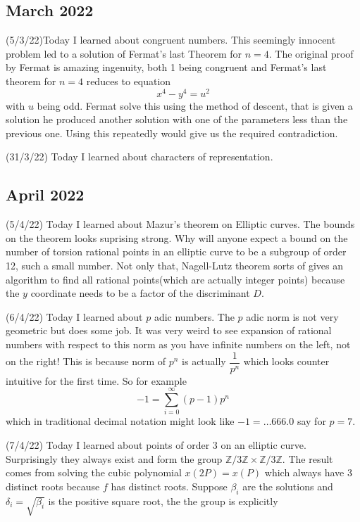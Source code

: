 \documentclass[12pt,a4paper]{article}
\newcommand{\Z}{\mathbb{Z}}
\begin{document}
   	
\subsection*{March 2022}
   	
\quad (5/3/22)Today I learned about congruent numbers. This seemingly innocent problem led to a solution of Fermat's last Theorem for $n=4$. The original proof by Fermat is amazing ingenuity, both 1 being congruent and Fermat's last theorem for $n=4$ reduces to equation
   \[ x^4-y^4 = u^2 \]
with $u$  being odd. Fermat solve this using the method of descent, that is given a solution he produced another solution with one of the parameters less than the previous one. Using this repeatedly would give us the required contradiction.
   
(31/3/22) Today I learned about characters of representation. 
   	
   
\subsection*{April 2022}
   
\quad (5/4/22) Today I learned about Mazur's theorem on Elliptic curves. The bounds on the theorem looks suprising strong. Why will anyone expect a bound on the number of torsion rational points in an elliptic curve to be a subgroup of order 12, such a small number. Not only that, Nagell-Lutz theorem sorts of gives an algorithm to find all rational points(which are actually integer points) because the $y$ coordinate needs to be a factor of the discriminant $D$.
   
(6/4/22) Today I learned about $p$ adic numbers. The $p$ adic norm is not very geometric but does some job. It was very weird to see expansion of rational numbers with respect to this norm as you have infinite numbers on the left, not on the right! This is because norm of $p^n$ is actually $\dfrac{1}{p^n}$ which looks counter intuitive for the first time. So for example 
   \[ -1 = \sum_{i = 0}^{\infty} (p-1)p^n\]
   which in traditional decimal notation might look like $-1 = \ldots 666.0$ say for $p = 7$.
   
(7/4/22) Today I learned about points of order 3 on an elliptic curve. Surprisingly they always exist and form the group $\Z / 3\Z \times \Z /3\Z$. The result comes from solving the cubic polynomial $x(2P) = x(P)$ which always have 3 distinct roots because $f$ has distinct roots. Suppose $\beta_i$ are the solutions and $\delta_i = \sqrt{\beta_i}$ is the positive square root, the the group is explicitly
   
\end{document}
